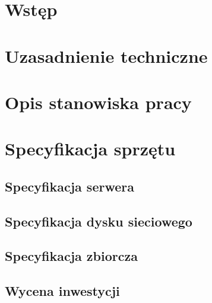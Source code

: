 	\section{Wstęp}		
		
	
	\section{Uzasadnienie techniczne}
		
	
	
	
	\section{Opis stanowiska pracy}
						 
		
	\section{Specyfikacja sprzętu}
        	\subsection{Specyfikacja serwera}
            		

		\subsection{Specyfikacja dysku sieciowego}	
			
			
		\subsection{Specyfikacja zbiorcza}	
			

		
							
	\subsection{Wycena inwestycji}
	 	

		
